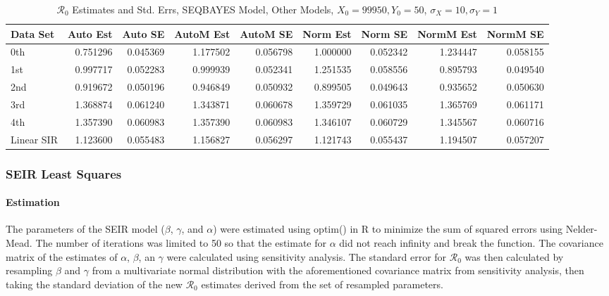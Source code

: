 \documentclass[12pt]{article}
\newcommand{\rr}{\ensuremath{\mathcal{R}_0}}
\begin{document}
\begin{table}[H]
	
	\caption{$\rr$ Estimates and Std. Errs, SEQBAYES Model,
		Other Models, $X_0 = 99950, Y_0 = 50$, 
		$\sigma_X = 10, \sigma_Y = 1$}
	\begin{footnotesize}
		\hskip -1cm
		\begin{tabular}{l|r|r|r|r|r|r|r|r}
			\hline
			Data Set & Auto Est & Auto SE & AutoM Est & AutoM SE & Norm Est & Norm SE & NormM Est & NormM SE\\
			\hline
			0th & 0.751296 & 0.045369 & 1.177502 & 0.056798 & 1.000000 & 0.052342 & 1.234447 & 0.058155\\
			\hline
			1st & 0.997717 & 0.052283 & 0.999939 & 0.052341 & 1.251535 & 0.058556 & 0.895793 & 0.049540\\
			\hline
			2nd & 0.919672 & 0.050196 & 0.946849 & 0.050932 & 0.899505 & 0.049643 & 0.935652 & 0.050630\\
			\hline
			3rd & 1.368874 & 0.061240 & 1.343871 & 0.060678 & 1.359729 & 0.061035 & 1.365769 & 0.061171\\
			\hline
			4th & 1.357390 & 0.060983 & 1.357390 & 0.060983 & 1.346107 & 0.060729 & 1.345567 & 0.060716\\
			\hline
			Linear SIR & 1.123600 & 0.055483 & 1.156827 & 0.056297 & 1.121743 & 0.055437 & 1.194507 & 0.057207\\
			\hline
		\end{tabular}
	\end{footnotesize}
\end{table}

\subsubsection{SEIR Least Squares}

\paragraph{Estimation}

The parameters of the SEIR model ($\beta$, $\gamma$, and $\alpha$) were estimated using optim() in R to minimize the sum of squared errors using Nelder-Mead. The number of iterations was limited to 50 so that the estimate for $\alpha$ did not reach infinity and break the function. The covariance matrix of the estimates of $\alpha$, $\beta$, an $\gamma$ were calculated using sensitivity analysis. The standard error for $\rr$ was then calculated by resampling $\beta$ and $\gamma$ from a multivariate normal distribution with the aforementioned covariance matrix from sensitivity analysis, then taking the standard deviation of the new $\rr$ estimates derived from the set of resampled parameters.
\end{document}

